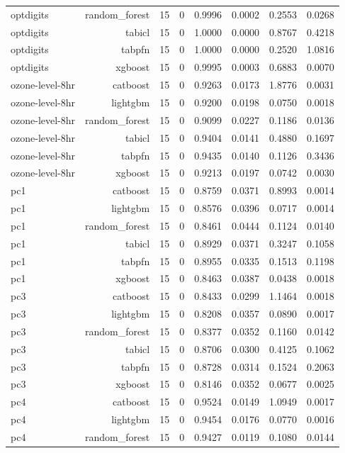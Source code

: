 \begin{table}[htbp]
\begin{tabular}{lrrrrrrr}
optdigits & random\_forest & 15 & 0 & 0.9996 & 0.0002 & 0.2553 & 0.0268 \\
optdigits & tabicl & 15 & 0 & 1.0000 & 0.0000 & 0.8767 & 0.4218 \\
optdigits & tabpfn & 15 & 0 & 1.0000 & 0.0000 & 0.2520 & 1.0816 \\
optdigits & xgboost & 15 & 0 & 0.9995 & 0.0003 & 0.6883 & 0.0070 \\
ozone-level-8hr & catboost & 15 & 0 & 0.9263 & 0.0173 & 1.8776 & 0.0031 \\
ozone-level-8hr & lightgbm & 15 & 0 & 0.9200 & 0.0198 & 0.0750 & 0.0018 \\
ozone-level-8hr & random\_forest & 15 & 0 & 0.9099 & 0.0227 & 0.1186 & 0.0136 \\
ozone-level-8hr & tabicl & 15 & 0 & 0.9404 & 0.0141 & 0.4880 & 0.1697 \\
ozone-level-8hr & tabpfn & 15 & 0 & 0.9435 & 0.0140 & 0.1126 & 0.3436 \\
ozone-level-8hr & xgboost & 15 & 0 & 0.9213 & 0.0197 & 0.0742 & 0.0030 \\
pc1 & catboost & 15 & 0 & 0.8759 & 0.0371 & 0.8993 & 0.0014 \\
pc1 & lightgbm & 15 & 0 & 0.8576 & 0.0396 & 0.0717 & 0.0014 \\
pc1 & random\_forest & 15 & 0 & 0.8461 & 0.0444 & 0.1124 & 0.0140 \\
pc1 & tabicl & 15 & 0 & 0.8929 & 0.0371 & 0.3247 & 0.1058 \\
pc1 & tabpfn & 15 & 0 & 0.8955 & 0.0335 & 0.1513 & 0.1198 \\
pc1 & xgboost & 15 & 0 & 0.8463 & 0.0387 & 0.0438 & 0.0018 \\
pc3 & catboost & 15 & 0 & 0.8433 & 0.0299 & 1.1464 & 0.0018 \\
pc3 & lightgbm & 15 & 0 & 0.8208 & 0.0357 & 0.0890 & 0.0017 \\
pc3 & random\_forest & 15 & 0 & 0.8377 & 0.0352 & 0.1160 & 0.0142 \\
pc3 & tabicl & 15 & 0 & 0.8706 & 0.0300 & 0.4125 & 0.1062 \\
pc3 & tabpfn & 15 & 0 & 0.8728 & 0.0314 & 0.1524 & 0.2063 \\
pc3 & xgboost & 15 & 0 & 0.8146 & 0.0352 & 0.0677 & 0.0025 \\
pc4 & catboost & 15 & 0 & 0.9524 & 0.0149 & 1.0949 & 0.0017 \\
pc4 & lightgbm & 15 & 0 & 0.9454 & 0.0176 & 0.0770 & 0.0016 \\
pc4 & random\_forest & 15 & 0 & 0.9427 & 0.0119 & 0.1080 & 0.0144 \\

\end{tabular}
\end{table}
